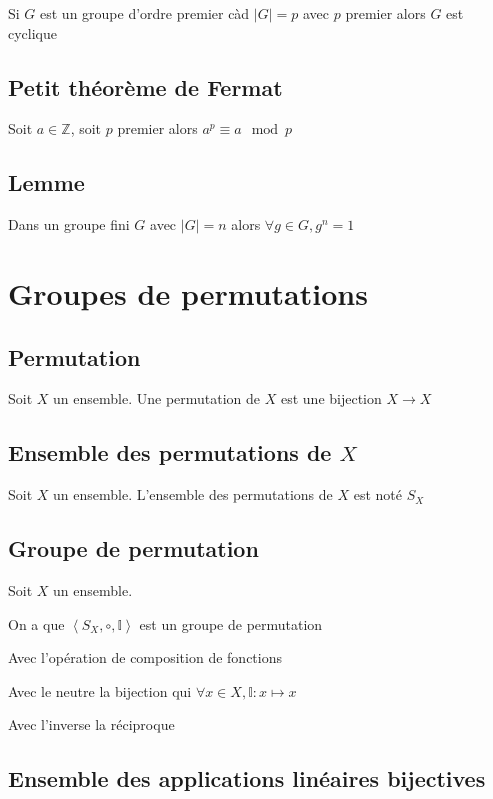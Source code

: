 \documentclass[a4paper,10pt]{article}
\newcommand{\card}[1]{\left\vert #1 \right\vert}
\newcommand{\grp}[1]{\left\langle #1 \right\rangle}
\newcommand{\ap}{\rightarrow}
\newcommand{\Z}{\mathbb{Z}}
\begin{document}
Si $G$ est un groupe d'ordre premier càd $\card{G} = p$ avec $p$ premier alors $G$ est cyclique

\subsection{Petit théorème de Fermat}

Soit $a \in \Z$, soit $p$ premier alors $a^p \equiv a \mod p$

\subsection{Lemme}

Dans un groupe fini $G$ avec $\card{G}=n$ alors $\forall g \in G, g^n = 1$


\section{Groupes de permutations}

\subsection{Permutation}

Soit $X$ un ensemble. Une permutation de $X$ est une bijection $X \ap X$

\subsection{Ensemble des permutations de $X$}

Soit $X$ un ensemble. L'ensemble des permutations de $X$ est noté $S_X$

\subsection{Groupe de permutation}

Soit $X$ un ensemble.

On a que $\grp{S_X,\circ,\mathbb{I}}$ est un groupe de permutation

Avec l'opération de composition de fonctions

Avec le neutre la bijection qui $\forall x \in X, \mathbb{I} : x \mapsto x$

Avec l'inverse la réciproque

\subsection{Ensemble des applications linéaires bijectives}
\end{document}
